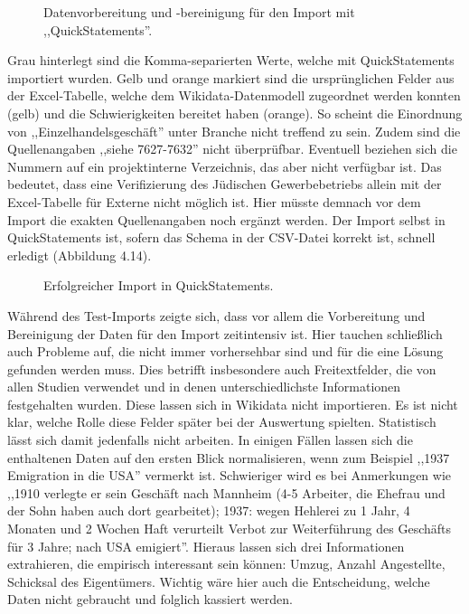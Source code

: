 \begin{figure}[h]
    \centering
    \caption{Datenvorbereitung und -bereinigung für den Import mit ,,QuickStatements''.}
    \label{fig:x cubed graph}
\end{figure}

Grau hinterlegt sind die Komma-separierten Werte, welche mit QuickStatements importiert wurden. Gelb und orange markiert sind die ursprünglichen Felder aus der Excel-Tabelle, welche dem Wikidata-Datenmodell zugeordnet werden konnten (gelb) und die Schwierigkeiten bereitet haben (orange). So scheint die Einordnung von ,,Einzelhandelsgeschäft'' unter Branche nicht treffend zu sein. Zudem sind die Quellenangaben ,,siehe 7627-7632'' nicht überprüfbar. Eventuell beziehen sich die Nummern auf ein projektinterne Verzeichnis, das aber nicht verfügbar ist. Das bedeutet, dass eine Verifizierung des Jüdischen Gewerbebetriebs allein mit der Excel-Tabelle für Externe nicht möglich ist. Hier müsste demnach vor dem Import die exakten Quellenangaben noch ergänzt werden. Der Import selbst in QuickStatements ist, sofern das Schema in der CSV-Datei korrekt ist, schnell erledigt (Abbildung 4.14).

\begin{figure}[h]
    \centering
    \caption{Erfolgreicher Import in QuickStatements.}
    \label{fig:x cubed graph}
\end{figure}

Während des Test-Imports zeigte sich, dass vor allem die Vorbereitung und Bereinigung der Daten für den Import zeitintensiv ist. Hier tauchen schließlich auch Probleme auf, die nicht immer vorhersehbar sind und für die eine Lösung gefunden werden muss. Dies betrifft insbesondere auch Freitextfelder, die von allen Studien verwendet und in denen unterschiedlichste Informationen festgehalten wurden. Diese lassen sich in Wikidata nicht importieren. Es ist nicht klar, welche Rolle diese Felder später bei der Auswertung spielten. Statistisch lässt sich damit jedenfalls nicht arbeiten. In einigen Fällen lassen sich die enthaltenen Daten auf den ersten Blick normalisieren, wenn zum Beispiel ,,1937 Emigration in die USA'' vermerkt ist. Schwieriger wird es bei Anmerkungen wie ,,1910 verlegte er sein Geschäft nach Mannheim (4-5 Arbeiter, die Ehefrau und der Sohn haben auch dort gearbeitet); 1937: wegen Hehlerei zu 1 Jahr, 4 Monaten und 2 Wochen Haft verurteilt Verbot zur Weiterführung des Geschäfts für 3 Jahre; nach USA emigiert''. Hieraus lassen sich drei Informationen extrahieren, die empirisch interessant sein können: Umzug, Anzahl Angestellte, Schicksal des Eigentümers. Wichtig wäre hier auch die Entscheidung, welche Daten nicht gebraucht und folglich kassiert werden.

